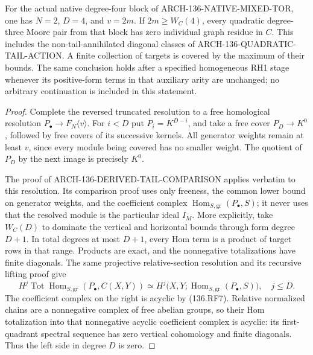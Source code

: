 For the actual native degree-four block of
ARCH-136-NATIVE-MIXED-TOR, one has
\(N=2\), \(D=4\), and \(v=2m\).  If
\(2m\geq W_C(4)\), every quadratic degree-three Moore
pair from that block has zero individual graph residue in
\(C\).  This includes the non-tail-annihilated diagonal
classes of ARCH-136-QUADRATIC-TAIL-ACTION.  A finite collection
of targets is covered by the maximum of their bounds.  The same
conclusion holds after a specified homogeneous RH1 stage whenever
its positive-form terms in that auxiliary arity are unchanged;
no arbitrary continuation is included in this statement.

\begin{proof}
Complete the reversed truncated resolution to a free homological
resolution \(P_\bullet\to F_N\langle v\rangle\).
For \(i<D\) put \(P_i=K^{D-i}\), and take a free cover
\(P_D\to K^0\), followed by free covers of its successive
kernels.  All generator weights remain at least \(v\),
since every module being covered has no smaller weight.
The quotient of \(P_D\) by the next image is precisely
\(K^0\).

The proof of ARCH-136-DERIVED-TAIL-COMPARISON applies verbatim
to this resolution.  Its comparison proof uses only freeness,
the common lower bound on generator weights, and the coefficient
complex \(\operatorname{Hom}_{S,\mathrm{gr}}(P_\bullet,S)\);
it never uses that the resolved module is the particular ideal
\(I_M\).  More explicitly, take \(W_C(D)\) to dominate
the vertical and horizontal bounds through form degree \(D+1\).
In total degrees at most \(D+1\), every Hom term is a product
of target rows in that range.  Products are exact, and the
nonnegative totalizations have finite diagonals.  The same
projective relative-section resolution and its recursive lifting
proof give
\[
 H^j\operatorname{Tot}\operatorname{Hom}_{S,\mathrm{gr}}
                  (P_\bullet,C(X,Y))
  \simeq H^j\bigl(X,Y;
                \operatorname{Hom}_{S,\mathrm{gr}}(P_\bullet,S)
             \bigr),\quad j\leq D.                    \tag{136.RF10}
\]
The coefficient complex on the right is acyclic by (136.RF7).
Relative normalized chains are a nonnegative complex of free
abelian groups, so their Hom totalization into that nonnegative
acyclic coefficient complex is acyclic: its first-quadrant
spectral sequence has zero vertical cohomology and finite
diagonals.  Thus the left side in degree \(D\) is zero.


\end{proof}
